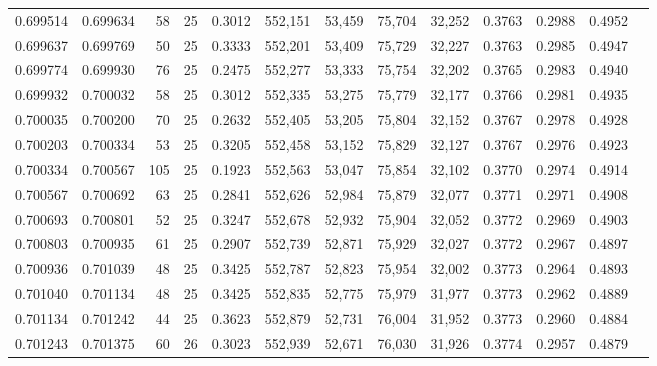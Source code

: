 \begin{tabular}{rrrrrrrrrrrrr}
0.699514 & 0.699634 &    58 &  25 &                                     0.3012 & 552,151 &  53,459 &  75,704 &  32,252 & 0.3763 & 0.2988 & 0.4952 \\
0.699637 & 0.699769 &    50 &  25 &                                     0.3333 & 552,201 &  53,409 &  75,729 &  32,227 & 0.3763 & 0.2985 & 0.4947 \\
0.699774 & 0.699930 &    76 &  25 &                                     0.2475 & 552,277 &  53,333 &  75,754 &  32,202 & 0.3765 & 0.2983 & 0.4940 \\
0.699932 & 0.700032 &    58 &  25 &                                     0.3012 & 552,335 &  53,275 &  75,779 &  32,177 & 0.3766 & 0.2981 & 0.4935 \\
0.700035 & 0.700200 &    70 &  25 &                                     0.2632 & 552,405 &  53,205 &  75,804 &  32,152 & 0.3767 & 0.2978 & 0.4928 \\
0.700203 & 0.700334 &    53 &  25 &                                     0.3205 & 552,458 &  53,152 &  75,829 &  32,127 & 0.3767 & 0.2976 & 0.4923 \\
0.700334 & 0.700567 &   105 &  25 &                                     0.1923 & 552,563 &  53,047 &  75,854 &  32,102 & 0.3770 & 0.2974 & 0.4914 \\
0.700567 & 0.700692 &    63 &  25 &                                     0.2841 & 552,626 &  52,984 &  75,879 &  32,077 & 0.3771 & 0.2971 & 0.4908 \\
0.700693 & 0.700801 &    52 &  25 &                                     0.3247 & 552,678 &  52,932 &  75,904 &  32,052 & 0.3772 & 0.2969 & 0.4903 \\
0.700803 & 0.700935 &    61 &  25 &                                     0.2907 & 552,739 &  52,871 &  75,929 &  32,027 & 0.3772 & 0.2967 & 0.4897 \\
0.700936 & 0.701039 &    48 &  25 &                                     0.3425 & 552,787 &  52,823 &  75,954 &  32,002 & 0.3773 & 0.2964 & 0.4893 \\
0.701040 & 0.701134 &    48 &  25 &                                     0.3425 & 552,835 &  52,775 &  75,979 &  31,977 & 0.3773 & 0.2962 & 0.4889 \\
0.701134 & 0.701242 &    44 &  25 &                                     0.3623 & 552,879 &  52,731 &  76,004 &  31,952 & 0.3773 & 0.2960 & 0.4884 \\
0.701243 & 0.701375 &    60 &  26 &                                     0.3023 & 552,939 &  52,671 &  76,030 &  31,926 & 0.3774 & 0.2957 & 0.4879 \\

\end{tabular}
